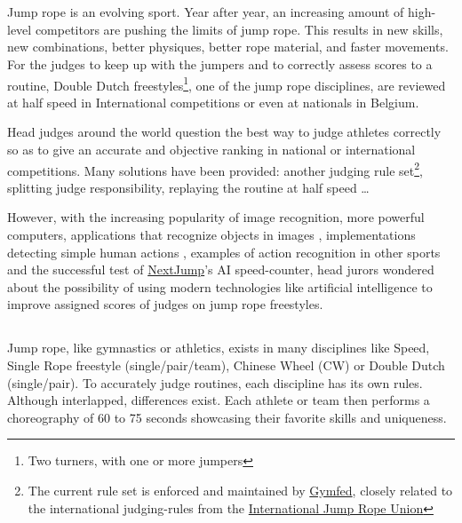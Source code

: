 
\chapter{}%
\label{ch:inleiding}

Jump rope is an evolving sport.
Year after year, an increasing amount of high-level competitors are pushing the limits of jump rope.
This results in new skills, new combinations, better physiques, better rope material, and faster movements. For the judges to keep up with the jumpers and to correctly assess scores to a routine, Double Dutch freestyles\footnote{Two turners, with one or more jumpers}, one of the jump rope disciplines, are reviewed at half speed in International competitions or even at nationals in Belgium.

Head judges around the world question the best way to judge athletes correctly so as to give an accurate and objective ranking in national or international competitions.
Many solutions have been provided: another judging rule set\footnote{The current rule set is enforced and maintained by \href{https://www.gymfed.be/}{Gymfed}, closely related to the international judging-rules from the \href{https://ijru.sport/}{International Jump Rope Union}}, splitting judge responsibility, replaying the routine at half speed \dots

However, with the increasing popularity of image recognition, more powerful computers, applications that recognize objects in images \autocite{Singh_Gill_2022}, implementations detecting simple human actions \autocite{LUQMAN_2022}, examples of action recognition in other sports \autocite{Yin_2024} and the successful test of \href{https://nextjump.app/}{NextJump}'s AI speed-counter, head jurors wondered about the possibility of using modern technologies like artificial intelligence to improve assigned scores of judges on jump rope freestyles.

\section{}%
\label{sec:probleemstelling}

Jump rope, like gymnastics or athletics, exists in many disciplines like Speed, Single Rope freestyle (single/pair/team), Chinese Wheel (CW) or Double Dutch (single/pair).
To accurately judge routines, each discipline has its own rules. Although interlapped, differences exist. Each athlete or team then performs a choreography of 60 to 75 seconds showcasing their favorite skills and uniqueness.


